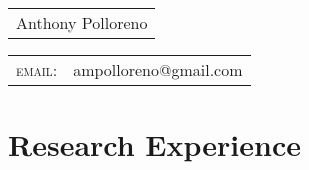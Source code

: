 \documentclass[a4paper,10pt]{article}
\begin{document}
\newcommand*{\fontin}[2]{{\setmainfont{Fontin}#1{#2}}}

\pagestyle{empty} %




\begin{tabular}{l}

{\Huge Anthony Polloreno}\\\end{tabular} \hfill
\begin{tabular}{lr}
    \fontin{\textsc}{email:}     & ampolloreno@gmail.com
\end{tabular}

\section{Research Experience}
\end{document}
